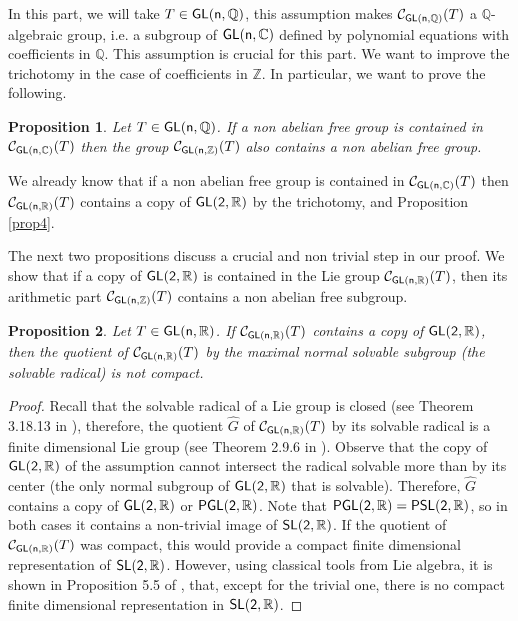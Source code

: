 \documentclass[a4paper,11pt]{article}
\newtheorem{proposition}{Proposition}[section]
\theoremstyle{definition}
\newcommand{\Z}{\mathbb Z}
\newcommand{\Q}{\mathbb Q}
\newcommand{\C}{\mathcal C}
\newcommand{\R}{\mathbb R}
\def \GL{\sf{GL}}
\newcommand{\SL}{\sf{SL}}
\newcommand{\PSL}{\sf{PSL}}
\newcommand{\PGL}{\sf{PGL}}
\begin{document}
 In this part, we will take $T\in \GL(n,\Q)$, this assumption makes $\C_{\GL(n,\Q)}(T)$ a $\Q$-algebraic group, i.e. a subgroup of $\GL(n,\mathbb{C})$ defined by polynomial equations with coefficients in $\Q$. This assumption is crucial for this part. We want to improve the trichotomy in the case of coefficients in $\Z$. In particular, we want to prove the following.
 
 \begin{proposition}\label{prop10}
Let $T\in \GL(n,\Q)$. If a non abelian free group is contained in $\C_{\GL(n,\mathbb{C})}(T)$ then the group $\C_{\GL(n,\Z)}(T)$ also contains a non abelian free group.
 \end{proposition}

We already know that if a non abelian free group
is contained in $\C_{\GL(n,\mathbb{C})}(T)$ then $\C_{\GL(n,\R)}(T)$ contains a copy of
$\GL(2,\R)$ by the trichotomy, and Proposition \ref{prop4}.

The next two propositions discuss a crucial and non trivial step in our proof. We show that if a copy of $\GL(2,\R)$ is contained in the Lie group $\C_{\GL(n,\R)}(T)$, then  its arithmetic part $\C_{\GL(n,\Z)}(T)$ contains a non abelian free subgroup.


\begin{proposition}\label{prop11}
 Let $T\in \GL(n,\R)$. If $\C_{\GL(n,\R)}(T)$ contains a copy
of $\GL(2,\R)$, then the quotient of $\C_{\GL(n,\R)}(T)$ by the maximal normal solvable subgroup (the solvable radical) is not compact. 
\end{proposition}

\begin{proof}
Recall that the solvable radical of a Lie group is closed (see Theorem 3.18.13 in \cite{varadarajan2013lie}), therefore, the quotient $\widehat{G}$ of $\C_{\GL(n,\R)}(T)$  by its solvable radical is a finite dimensional Lie group (see Theorem 2.9.6 in \cite{varadarajan2013lie}). Observe that the copy of $\GL(2,\R)$ of the assumption cannot intersect the radical solvable more than by its center (the only  normal subgroup of   $\GL(2,\R)$ that is solvable). Therefore, $\widehat{G}$ contains a copy of $\GL(2,\R)$ or $\PGL(2,\R)$. Note that $\PGL(2,\R)=\PSL(2,\R)$, so in both cases it contains a non-trivial image of $\SL(2,\R)$.
If the quotient of $\C_{\GL(n,\R)}(T)$ was compact,  this would provide a compact finite
dimensional representation of $\SL(2,\R)$.  However, using classical tools from Lie algebra, it is shown in Proposition 5.5 of \cite{zbMATH06064700}, that, except for the trivial one, there is no compact finite dimensional representation in $\SL(2,\R)$.

\end{proof}
\end{document}
